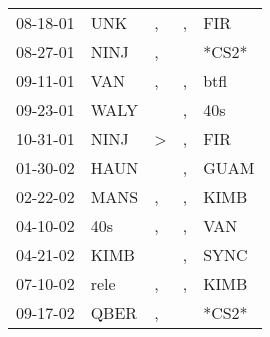 \begin{supertabular}{p{0.07\textwidth}p{0.06\textwidth}p{0.02\textwidth}p{0.02\textwidth}p{0.06\textwidth}}
 08-18-01\textsuperscript{} &   UNK\textsuperscript{} &             , &  , &   FIR\textsuperscript{} \\
 08-27-01\textsuperscript{} &  NINJ\textsuperscript{} &             , &    &                   *CS2* \\
 09-11-01\textsuperscript{} &   VAN\textsuperscript{} &             , &  , &  btfl\textsuperscript{} \\
 09-23-01\textsuperscript{} &  WALY\textsuperscript{} &               &  , &   40s\textsuperscript{} \\
 10-31-01\textsuperscript{} &  NINJ\textsuperscript{} &  \textgreater &  , &   FIR\textsuperscript{} \\
 01-30-02\textsuperscript{} &  HAUN\textsuperscript{} &               &  , &  GUAM\textsuperscript{} \\
 02-22-02\textsuperscript{} &  MANS\textsuperscript{} &             , &  , &  KIMB\textsuperscript{} \\
 04-10-02\textsuperscript{} &   40s\textsuperscript{} &             , &  , &   VAN\textsuperscript{} \\
 04-21-02\textsuperscript{} &  KIMB\textsuperscript{} &               &  , &  SYNC\textsuperscript{} \\
 07-10-02\textsuperscript{} &  rele\textsuperscript{} &             , &  , &  KIMB\textsuperscript{} \\
 09-17-02\textsuperscript{} &  QBER\textsuperscript{} &             , &    &                   *CS2* \\
\end{supertabular}
